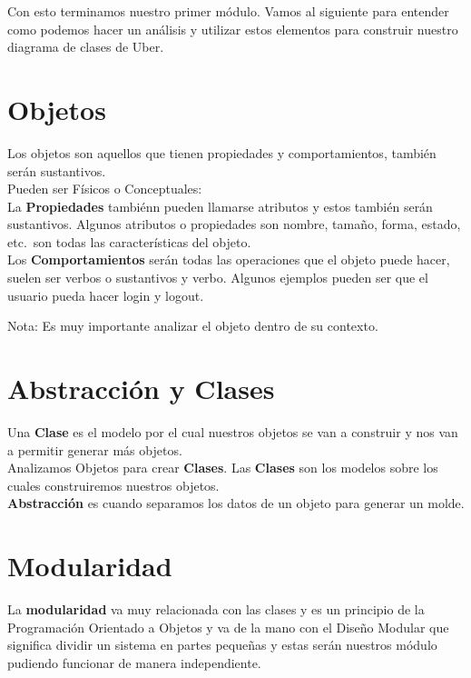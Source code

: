 \documentclass{article}
\begin{document}
Con esto terminamos nuestro primer módulo. Vamos al siguiente para entender
como podemos hacer un análisis y utilizar estos elementos para construir
nuestro diagrama de clases de Uber.


\section{Objetos}%
Los objetos son aquellos que tienen propiedades y comportamientos, también
serán sustantivos.\\

Pueden ser Físicos o Conceptuales:\\

La \textbf{Propiedades} tambiénn pueden llamarse atributos y estos también
serán sustantivos. Algunos atributos o propiedades son nombre, tamaño, forma,
estado, etc.\ son todas las características del objeto.\\

Los \textbf{Comportamientos} serán todas las operaciones que el objeto puede
hacer, suelen ser verbos o sustantivos y verbo. Algunos ejemplos pueden ser que
el usuario pueda hacer login y logout.

Nota: Es muy importante analizar el objeto dentro de su contexto.


\section{Abstracción y Clases}%
Una \textbf{Clase} es el modelo por el cual nuestros objetos se van a construir
y nos van a permitir generar más objetos.\\

Analizamos Objetos para crear \textbf{Clases}. Las \textbf{Clases} son los
modelos sobre los cuales construiremos nuestros objetos.\\

\textbf{Abstracción} es cuando separamos los datos de un objeto para generar un molde.

\section{Modularidad}%
La \textbf{modularidad} va muy relacionada con las clases y es un principio de
la Programación Orientado a Objetos y va de la mano con el Diseño Modular que
significa dividir un sistema en partes pequeñas y estas serán nuestros módulo
pudiendo funcionar de manera independiente.\\
\end{document}
